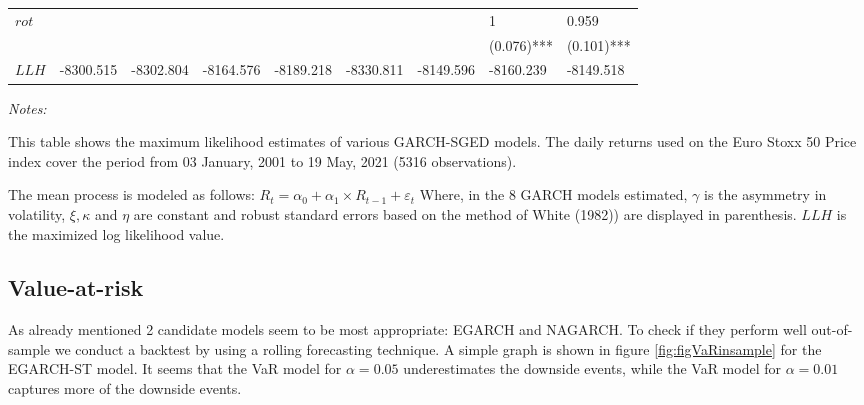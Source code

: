 \documentclass[a4paper, nobind]{templates/ociamthesis}
\begin{document}
\begin{landscape}
\begin{table}
\begin{threeparttable}
{\begin{tabular}[t]{lllllllll}
$rot$ &  &  &  &  &  &  & 1 & 0.959\\
 &  &  &  &  &  &  & (0.076)*** & (0.101)***\\
\addlinespace
$LLH$ & -8300.515 & -8302.804 & -8164.576 & -8189.218 & -8330.811 & -8149.596 & -8160.239 & -8149.518\\
\bottomrule
\end{tabular}}
\begin{tablenotes}
\item \textit{Notes:} 
\item This table shows the maximum likelihood estimates of various GARCH-SGED models. The daily returns used on the Euro Stoxx 50 Price index cover the period from 03 January, 2001 to 19 May, 2021 (5316 observations).
\item The mean process is modeled as follows: $R_t= \alpha_0+ \alpha_1 \times R_{t-1}+ \varepsilon_t$ Where, in the 8 GARCH models estimated, $\gamma$ is the asymmetry in volatility, $\xi, \kappa$ and $\eta$ are constant and robust standard errors based on the method of White (1982)) are displayed in parenthesis. $LLH$ is the maximized log likelihood value.
\end{tablenotes}
\end{threeparttable}
\end{table}
\end{landscape}

\clearpage
\newpage

\hypertarget{value-at-risk-1}{%
\subsection{Value-at-risk}\label{value-at-risk-1}}

\noindent As already mentioned 2 candidate models seem to be most appropriate: EGARCH and NAGARCH. To check if they perform well out-of-sample we conduct a backtest by using a rolling forecasting technique. A simple graph is shown in figure \ref{fig:figVaRinsample} for the EGARCH-ST model. It seems that the VaR model for \(\alpha=0.05\) underestimates the downside events, while the VaR model for \(\alpha=0.01\) captures more of the downside events.
\end{document}
